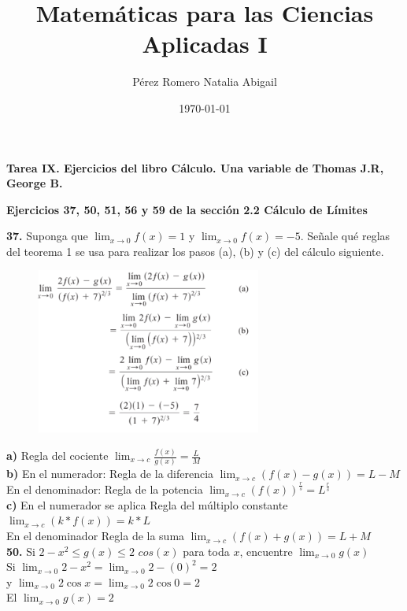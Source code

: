 \documentclass[12pt, letterpaper]{article}
\title{Matemáticas para las Ciencias Aplicadas I}
\author{Pérez Romero Natalia Abigail}
\date{\today}
\begin{document}
\maketitle
\textbf{Tarea IX. Ejercicios del libro Cálculo. Una variable de Thomas J.R, George B.}

\textbf{Ejercicios  37, 50, 51, 56 y 59 de la sección 2.2 Cálculo de Límites}

\textbf{37.}
Suponga que $\lim_{x \to 0} f(x) = 1$ y $\lim_{x \to 0} f(x) = -5$. Señale qué reglas del teorema 1 se usa para realizar los pasos (a), (b) y (c) del cálculo siguiente.\\

\begin{figure}[ht]
\centering
\includegraphics[width=20em]{t9uno}
\end{figure}

\textbf{a)} Regla del cociente  $\lim_{x \to c} \frac{f(x)}{g(x)} = \frac{L}{M}$ \\
\textbf{b)} En el numerador: Regla de la diferencia $\lim_{x \to c} (f(x)-g(x)) = L - M$\\
En el denominador: Regla de la potencia $\lim_{x \to c} (f(x))^{\frac{r}{s}} = L ^{\frac{r}{s}}$\\
\textbf{c)} En el numerador se aplica Regla del múltiplo constante $\lim_{x \to c} (k * f(x)) = k * L$\\
En el denominador Regla de la suma $\lim_{x \to c} (f(x)+g(x)) = L + M$\\


\textbf{50.} Si $2 - x^2 \leq g(x) \leq 2$ $cos (x)$ para toda $x$, encuentre $\lim_{x \to 0} g(x)$\\
Si  $\lim_{x \to 0} 2 - x^2 = \lim_{x \to 0} 2 - (0)^2 = 2$\\  
y  $\lim_{x \to 0} 2 \cos x = \lim_{x \to 0} 2 \cos 0 = 2$\\

El $\lim_{x \to 0} g(x) = 2$
\end{document}
